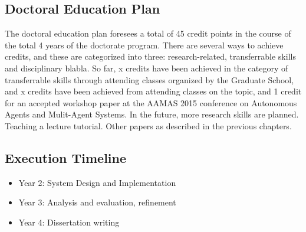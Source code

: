 \subsection{Doctoral Education Plan}
The doctoral education plan foresees a total of 45 credit points in the course of the total 4 years of the doctorate program. There are several ways to achieve credits, and these are categorized into three: research-related, transferrable skills and disciplinary blabla. So far, x credits have been achieved in the category of transferrable skills through attending classes organized by the Graduate School, and x credits have been achieved from attending classes on the topic, and 1 credit for an accepted workshop paper at the AAMAS 2015 conference on Autonomous Agents and Mulit-Agent Systems.
In the future, more research skills are planned.
Teaching a lecture tutorial.
Other papers as described in the previous chapters.

  
\subsection{Execution Timeline}  
\begin{itemize}
\item Year 2: System Design and Implementation
\item Year 3: Analysis and evaluation, refinement
\item Year 4: Dissertation writing
\end{itemize}
  
  
  
  
  